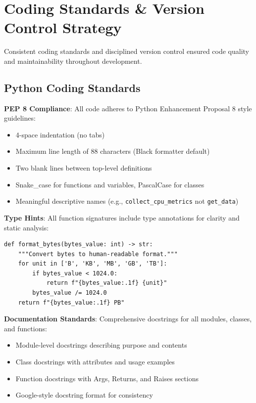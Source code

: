 \documentclass[12pt,a4paper,oneside]{report}
\begin{document}
\section{Coding Standards \& Version Control Strategy}
\label{sec:coding-standards}

Consistent coding standards and disciplined version control ensured code quality and maintainability throughout development.

\subsection{Python Coding Standards}

\textbf{PEP 8 Compliance}: All code adheres to Python Enhancement Proposal 8 style guidelines:
\begin{itemize}
    \item 4-space indentation (no tabs)
    \item Maximum line length of 88 characters (Black formatter default)
    \item Two blank lines between top-level definitions
    \item Snake\_case for functions and variables, PascalCase for classes
    \item Meaningful descriptive names (e.g., \texttt{collect\_cpu\_metrics} not \texttt{get\_data})
\end{itemize}

\textbf{Type Hints}: All function signatures include type annotations for clarity and static analysis:
\begin{lstlisting}
def format_bytes(bytes_value: int) -> str:
    """Convert bytes to human-readable format."""
    for unit in ['B', 'KB', 'MB', 'GB', 'TB']:
        if bytes_value < 1024.0:
            return f"{bytes_value:.1f} {unit}"
        bytes_value /= 1024.0
    return f"{bytes_value:.1f} PB"
\end{lstlisting}

\textbf{Documentation Standards}: Comprehensive docstrings for all modules, classes, and functions:
\begin{itemize}
    \item Module-level docstrings describing purpose and contents
    \item Class docstrings with attributes and usage examples
    \item Function docstrings with Args, Returns, and Raises sections
    \item Google-style docstring format for consistency
\end{itemize}
\end{document}
